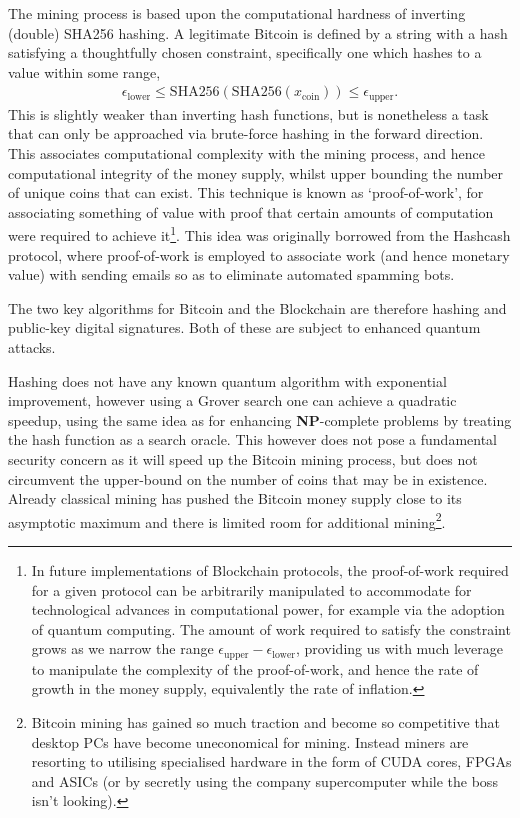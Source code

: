 The mining process is based upon the computational hardness of inverting (double) SHA256 hashing. A legitimate Bitcoin is defined by a string with a hash satisfying a thoughtfully chosen constraint, specifically one which hashes to a value within some range,
\begin{align}
	\epsilon_\mathrm{lower}\leq \mathrm{SHA256}(\mathrm{SHA256}(x_\mathrm{coin})) \leq \epsilon_\mathrm{upper}.
\end{align}
This is slightly weaker than inverting hash functions, but is nonetheless a task that can only be approached via brute-force hashing in the forward direction. This associates computational complexity with the mining process, and hence computational integrity of the money supply, whilst upper bounding the number of unique coins that can exist. This technique is known as `proof-of-work', for associating something of value with proof that certain amounts of computation were required to achieve it\footnote{In future implementations of Blockchain protocols, the proof-of-work required for a given protocol can be arbitrarily manipulated to accommodate for technological advances in computational power, for example via the adoption of quantum computing. The amount of work required to satisfy the constraint grows as we narrow the range \mbox{$\epsilon_\mathrm{upper}-\epsilon_\mathrm{lower}$}, providing us with much leverage to manipulate the complexity of the proof-of-work, and hence the rate of growth in the money supply, equivalently the rate of inflation.}. This idea was originally borrowed from the Hashcash protocol, where proof-of-work is employed to associate work (and hence monetary value) with sending emails so as to eliminate automated spamming bots.

The two key algorithms for Bitcoin and the Blockchain are therefore hashing and public-key digital signatures. Both of these are subject to enhanced quantum attacks.

Hashing does not have any known quantum algorithm with exponential improvement, however using a Grover search one can achieve a quadratic speedup, using the same idea as for enhancing \textbf{NP}-complete problems by treating the hash function as a search oracle. This however does not pose a fundamental security concern as it will speed up the Bitcoin mining process, but does not circumvent the upper-bound on the number of coins that may be in existence. Already classical mining has pushed the Bitcoin money supply close to its asymptotic maximum and there is limited room for additional mining\footnote{Bitcoin mining has gained so much traction and become so competitive that desktop PCs have become uneconomical for mining. Instead miners are resorting to utilising specialised hardware in the form of CUDA cores, FPGAs and ASICs (or by secretly using the company supercomputer while the boss isn't looking).}.

